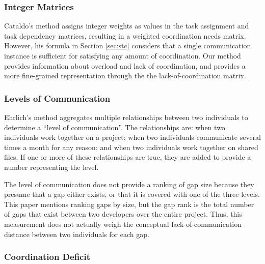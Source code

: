 \documentclass[12pt,oneside]{book}
\begin{document}
\subsubsection{Integer Matrices}

Cataldo's method assigns integer weights as values in the task assignment and task dependency matrices, resulting in a weighted coordination needs matrix. However, his formula in Section \ref{sec:stc} considers that a single communication instance is sufficient for satisfying any amount of coordination. Our method provides information about overload and lack of coordination, and provides a more fine-grained representation through the the lack-of-coordination matrix.

\subsubsection{Levels of Communication}

Ehrlich's method aggregates multiple relationships between two individuals to determine a ``level of communication''.  The relationships are: when two individuals work together on a project; when two individuals communicate several times a month for any reason; and when two individuals work together on shared files. If one or more of these relationships are true, they are added to provide a number representing the level.


The level of communication does not provide a ranking of gap size because they presume that a gap either exists, or that it is covered with one of the three levels. This paper mentions ranking gaps by size, but the gap rank is the total number of gaps that exist between two developers over the entire project. Thus, this measurement does not actually weigh the conceptual lack-of-communication distance between two individuals for each gap.

\subsubsection{Coordination Deficit}
\end{document}
